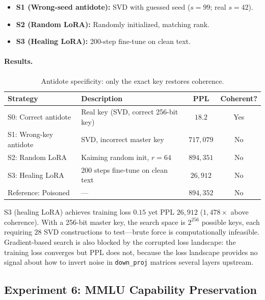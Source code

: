 \documentclass[10pt,letterpaper]{article}
\begin{document}
\begin{itemize}
    \item \textbf{S1 (Wrong-seed antidote):} SVD with guessed seed ($s=99$;
    real $s=42$).
    \item \textbf{S2 (Random LoRA):} Randomly initialized, matching rank.
    \item \textbf{S3 (Healing LoRA):} 200-step fine-tune on clean text.
\end{itemize}

\paragraph{Results.}
\begin{table}[h]
\centering
\caption{Antidote specificity: only the exact key restores coherence.}
\label{tab:specificity}
\begin{tabular}{llcc}
\toprule
\textbf{Strategy} & \textbf{Description} & \textbf{PPL} & \textbf{Coherent?} \\
\midrule
S0: Correct antidote    & Real key (SVD, correct 256-bit key) & $18.2$      & Yes \\
S1: Wrong-key antidote  & SVD, incorrect master key            & $717{,}079$ & No  \\
S2: Random LoRA         & Kaiming random init, $r=64$         & $894{,}351$ & No  \\
S3: Healing LoRA        & 200 steps fine-tune on clean text   & $26{,}912$  & No  \\
\midrule
Reference: Poisoned     & ---                                 & $894{,}352$ & No \\
\bottomrule
\end{tabular}
\end{table}

S3 (healing LoRA) achieves training loss $0.15$ yet PPL $26{,}912$
($1{,}478\times$ above coherence). With a 256-bit master key, the search
space is $2^{256}$ possible keys, each requiring $28$ SVD constructions to
test---brute force is computationally infeasible. Gradient-based search is
also blocked by the corrupted loss landscape: the training loss converges
but PPL does not, because the loss landscape provides no signal about how to
invert noise in \texttt{down\_proj} matrices several layers upstream.

\subsection{Experiment 6: MMLU Capability Preservation}
\label{sec:exp6}
\end{document}

